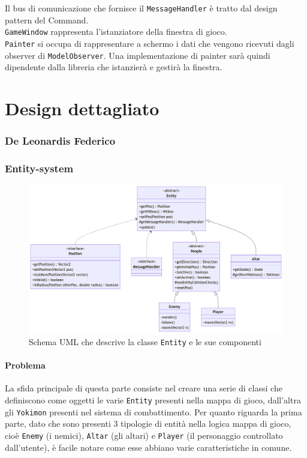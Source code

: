 \documentclass[a4paper,12pt]{report}
\begin{document}
%
Il bus di comunicazione che fornisce il \texttt{MessageHandler} è tratto dal design pattern del Command. \\
%
\texttt{GameWindow} rappresenta l’istanziatore della finestra di gioco. \\
%
\texttt{Painter} si occupa di rappresentare a schermo i dati che vengono ricevuti dagli observer di \texttt{ModelObserver}. 
%
Una implementazione di painter sarà quindi dipendente dalla libreria che istanzierà e gestirà la finestra.
\section{Design dettagliato}
\subsubsection{De Leonardis Federico}
\subsubsection{Entity-system}
\begin{figure}[H]
\centering{}
\includegraphics[width=1.0\columnwidth]{images/uml-entity.png}
\caption{Schema UML che descrive la classe \texttt{Entity} e le sue componenti}
\label{img:uml-entity}
\end{figure}
\paragraph{Problema} La sfida principale di questa parte consiste nel creare una serie di classi che definiscono come oggetti le varie \texttt{Entity} presenti nella mappa di gioco, dall’altra gli \texttt{Yokimon} presenti nel sistema di combattimento. 
%
Per quanto riguarda la prima parte, dato che sono presenti 3 tipologie di entità nella logica mappa di gioco, cioè \texttt{Enemy} (i nemici), \texttt{Altar} (gli altari) e \texttt{Player} (il personaggio controllato dall’utente), è facile notare come esse abbiano varie caratteristiche in comune.
\end{document}
